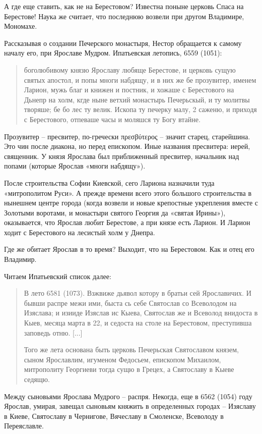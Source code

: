 А где еще ставить, как не на Берестовом? Известна поныне церковь Спаса на Берестове! Наука же считает, что последнюю возвели при другом Владимире, Мономахе. 

Рассказывая о создании Печерского монастыря, Нес\-тор обращается к самому началу его, при Ярославе Мудром. Ипатьевская летопись, 6559 (1051):

\begin{quotation}
боголюбивому князю Ярославу любяще Берестове, и церковь сущую святых апостол, и попы многи набдящу, и в них же бе прозувитер, именем Ларион, мужь благ и книжен и постник, и хожаше с Берестового на Дьнепр на холм, кгде ныне ветхий монастырь Печерьскый, и ту молитвы творяше; бе бо лес ту велик. Ископа ту печерку малу, 2 саженю, и приходя с Берестового, отпеваше часы и моляшся ту Богу втайне.
\end{quotation}

Прозувитер – пресвитер, по-гречески πρεσβύτερος – значит старец, старейшина. Это чин после диакона, но перед епископом. Иные названия пресвитера: иерей, священник. У князя Ярослава был приближенный пресвитер, начальник над попами (которые Ярослав «многи набдящу»).

После строительства Софии Киевской, сего Лариона назначили туда «митрополитом Руси». А прежде времени всего этого большого строительства в нынешнем центре города (когда возвели и новые крепостные укрепления вместе с Золотыми воротами, и монастыри святого Георгия да «святая Ирины»), оказывается, что Ярослав любит Берестове, а при князе есть Ларион. И Ларион ходит с Берестового на лесистый холм у Днепра.

Где же обитает Ярослав в то время? Выходит, что на Берестовом. Как и отец его Владимир.

Читаем Ипатьевский список далее:

\begin{quotation}
В лето 6581 (1073). Взжвиже дьявол котору в братьи сей Ярославичих. И бывши распре межи ими, быста сь себе Святослав со Всеволодом на Изяслава; и изииде Изяслав ис Кыева, Святослав же и Всеволод внидоста в Кыев, месяца марта в 22, и седоста на столе на Берестовом, преступивша заповедь отню. [...]

Того же лета основана быть церковь Печерьская Святославом князем, сыном Ярославлим, игуменом Федосьем, епископом Михаилом, митрополиту Георгиеви тогда сущю в Грецех, а Святославу в Кыеве седящю.
\end{quotation}

Между сыновьями Ярослава Мудрого – распря. Некогда, еще в 6562 (1054) году Ярослав, умирая, завещал сыновьям княжить в определенных городах – Изяславу в Киеве, Святославу в Чернигове, Вячеславу в Смоленске, Всеволоду в Переяславле. 

